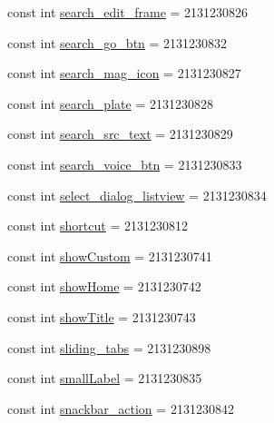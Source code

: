 \begin{DoxyCompactItemize}
\item 
const int \mbox{\hyperlink{class_f_w_p_s___app_1_1_droid_1_1_resource_1_1_id_ade26ce7c787c185df47015bee70d84e2}{search\+\_\+edit\+\_\+frame}} = 2131230826
\item 
const int \mbox{\hyperlink{class_f_w_p_s___app_1_1_droid_1_1_resource_1_1_id_adcc14bd67ee63fa53072483cdbba7d72}{search\+\_\+go\+\_\+btn}} = 2131230832
\item 
const int \mbox{\hyperlink{class_f_w_p_s___app_1_1_droid_1_1_resource_1_1_id_a28d55113789c5139dbbce905ed759b33}{search\+\_\+mag\+\_\+icon}} = 2131230827
\item 
const int \mbox{\hyperlink{class_f_w_p_s___app_1_1_droid_1_1_resource_1_1_id_ab8d617a45a930ec53778dd90162cd0b4}{search\+\_\+plate}} = 2131230828
\item 
const int \mbox{\hyperlink{class_f_w_p_s___app_1_1_droid_1_1_resource_1_1_id_a76a5878c245cf6783043d4416ae7eea4}{search\+\_\+src\+\_\+text}} = 2131230829
\item 
const int \mbox{\hyperlink{class_f_w_p_s___app_1_1_droid_1_1_resource_1_1_id_ac365cfad8dac847a381b9bf16d943f97}{search\+\_\+voice\+\_\+btn}} = 2131230833
\item 
const int \mbox{\hyperlink{class_f_w_p_s___app_1_1_droid_1_1_resource_1_1_id_a13b6354b316eba66e4309f310f866441}{select\+\_\+dialog\+\_\+listview}} = 2131230834
\item 
const int \mbox{\hyperlink{class_f_w_p_s___app_1_1_droid_1_1_resource_1_1_id_a204514acea1c63b020c9ac1ba5578c39}{shortcut}} = 2131230812
\item 
const int \mbox{\hyperlink{class_f_w_p_s___app_1_1_droid_1_1_resource_1_1_id_a111add03e6ccdc4df8184acda43d761f}{show\+Custom}} = 2131230741
\item 
const int \mbox{\hyperlink{class_f_w_p_s___app_1_1_droid_1_1_resource_1_1_id_a031f6d2afe4f6728e0b1bb84f0928d49}{show\+Home}} = 2131230742
\item 
const int \mbox{\hyperlink{class_f_w_p_s___app_1_1_droid_1_1_resource_1_1_id_a32ddbd33269385a1e7f69a44c50712ca}{show\+Title}} = 2131230743
\item 
const int \mbox{\hyperlink{class_f_w_p_s___app_1_1_droid_1_1_resource_1_1_id_afc29d8feef7ae1c9ec4e1031b430028a}{sliding\+\_\+tabs}} = 2131230898
\item 
const int \mbox{\hyperlink{class_f_w_p_s___app_1_1_droid_1_1_resource_1_1_id_abfe5260c1eaec92a78d8c9ba62591da3}{small\+Label}} = 2131230835
\item 
const int \mbox{\hyperlink{class_f_w_p_s___app_1_1_droid_1_1_resource_1_1_id_a7232dc58e18ee1d75f340b6e652b982c}{snackbar\+\_\+action}} = 2131230842

\end{DoxyCompactItemize}
